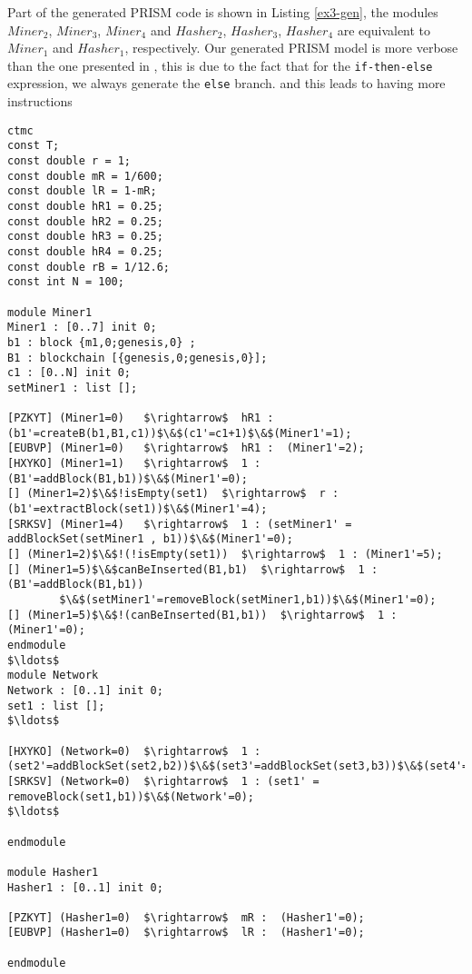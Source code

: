 Part of the generated PRISM code is shown in Listing \ref{ex3-gen}, 
the modules $Miner_2$, $Miner_3$, $Miner_4$ and $Hasher_2$, $Hasher_3$, $Hasher_4$ are equivalent to $Miner_1$ and $Hasher_1$, respectively.
Our generated PRISM model is more verbose than the one presented in \cite{DBLP:journals/concurrency/BistarelliNGLMV23},
this is due to the fact that for the \texttt{if-then-else} expression, we always generate the \texttt{else} branch.
and this leads to having more instructions
\begin{lstlisting}[style=prism-color,caption={Generated PRISM program for the Peer-To-Peer Protocol.},captionpos=b,label={ex3-gen}]
ctmc
const T;
const double r = 1;
const double mR = 1/600;
const double lR = 1-mR;
const double hR1 = 0.25;
const double hR2 = 0.25;
const double hR3 = 0.25;
const double hR4 = 0.25;
const double rB = 1/12.6;
const int N = 100;

module Miner1
Miner1 : [0..7] init 0;
b1 : block {m1,0;genesis,0} ; 
B1 : blockchain [{genesis,0;genesis,0}]; 
c1 : [0..N] init 0; 
setMiner1 : list []; 

[PZKYT] (Miner1=0)   $\rightarrow$  hR1 : (b1'=createB(b1,B1,c1))$\&$(c1'=c1+1)$\&$(Miner1'=1); 
[EUBVP] (Miner1=0)   $\rightarrow$  hR1 :  (Miner1'=2); 
[HXYKO] (Miner1=1)   $\rightarrow$  1 : (B1'=addBlock(B1,b1))$\&$(Miner1'=0); 
[] (Miner1=2)$\&$!isEmpty(set1)  $\rightarrow$  r : (b1'=extractBlock(set1))$\&$(Miner1'=4); 
[SRKSV] (Miner1=4)   $\rightarrow$  1 : (setMiner1' = addBlockSet(setMiner1 , b1))$\&$(Miner1'=0); 
[] (Miner1=2)$\&$!(!isEmpty(set1))  $\rightarrow$  1 : (Miner1'=5); 
[] (Miner1=5)$\&$canBeInserted(B1,b1)  $\rightarrow$  1 : (B1'=addBlock(B1,b1))
		$\&$(setMiner1'=removeBlock(setMiner1,b1))$\&$(Miner1'=0); 
[] (Miner1=5)$\&$!(canBeInserted(B1,b1))  $\rightarrow$  1 : (Miner1'=0);
endmodule
$\ldots$
module Network
Network : [0..1] init 0;
set1 : list []; 
$\ldots$

[HXYKO] (Network=0)  $\rightarrow$  1 : (set2'=addBlockSet(set2,b2))$\&$(set3'=addBlockSet(set3,b3))$\&$(set4'=addBlockSet(set4,b4))$\&$(Network'=0); 
[SRKSV] (Network=0)  $\rightarrow$  1 : (set1' = removeBlock(set1,b1))$\&$(Network'=0); 
$\ldots$

endmodule

module Hasher1
Hasher1 : [0..1] init 0;

[PZKYT] (Hasher1=0)  $\rightarrow$  mR :  (Hasher1'=0); 
[EUBVP] (Hasher1=0)  $\rightarrow$  lR :  (Hasher1'=0); 

endmodule
\end{lstlisting}

